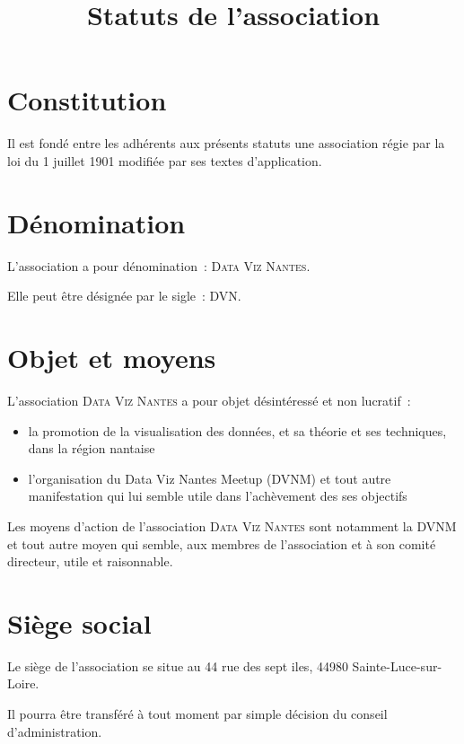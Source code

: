 \documentclass[12 pt]{article}
\title{Statuts de l'association \\
  \Nom}
\date{}
\newcommand{\Nom}{\textsc{Data Viz Nantes}}
\newcommand{\Sigle}{DVN}
\begin{document}
\maketitle

\section{Constitution}
\label{sec:constitution}

Il est fondé entre les adhérents aux présents statuts une association
régie par la loi du 1\ier{} juillet 1901 modifiée par ses textes
d'application.

\section{Dénomination}
\label{sec:denomination}
L'association a pour dénomination~: \og\Nom\fg.

Elle peut être désignée par le sigle~: \og\Sigle\fg.

\section{Objet et moyens}
\label{sec:objet-et-moyens}

L'association \Nom{} a pour objet désintéressé et non lucratif~:

\begin{itemize}
\item la promotion de la visualisation des données, et sa théorie et
  ses techniques, dans la région nantaise
\item l'organisation du Data Viz Nantes Meetup (DVNM) et tout
  autre manifestation qui lui semble utile dans l'achèvement des ses objectifs
\end{itemize}

Les moyens d'action de l'association \Nom{} sont notamment la DVNM et
tout autre moyen qui semble, aux membres de l'association et à son
comité directeur, utile et raisonnable.

\section{Siège social}
\label{sec:siege-social}

Le siège de l'association se situe au 44 rue des sept iles, 44980 Sainte-Luce-sur-Loire.

Il pourra être transféré à tout moment par simple décision du conseil
d'administration.
\end{document}
